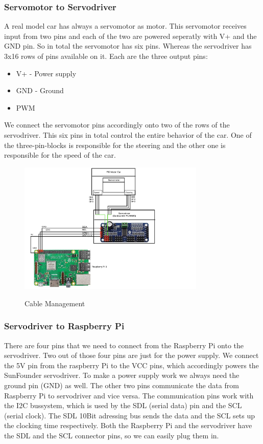 \documentclass[journal]{IEEEtran}
\begin{document}
\subsubsection{Servomotor to Servodriver}
A real model car has always a servomotor as motor. This servomotor receives input from two pins and each of the two are powered seperatly with V+ and the GND pin. 
So in total the servomotor has six pins. Whereas the servodriver has 3x16 rows of pins available on it. Each are the three output pins:

\begin{itemize}
\item V+ - Power supply
\item GND - Ground
\item PWM
\end{itemize}

We connect the servomotor pins accordingly onto two of the rows of the servodriver. This six pins in total control the entire behavior of the car. One of the three-pin-blocks is responsible for the steering and the other one is responsible for the speed of the car. \\

\begin{figure}
  \begin{center}
  \includegraphics[width=3.5in]{photo/ebene2.pdf}\\
  \caption{Cable Management}\label{ebene2}
  \end{center}
\end{figure}

\subsubsection{Servodriver to Raspberry Pi}
There are four pins that we need to connect from the Raspberry Pi onto the servodriver. Two out of those four pins are just for the power supply. We connect the 5V pin from the raspberry Pi to the VCC pins, which accordingly powers the SunFounder servodriver. To make a power supply work we always need the ground pin (GND) as well. The other two pins communicate the data from Raspberry Pi to servodriver and vice versa. The communication pins work with the I2C bussystem, which is used by the SDL (serial data) pin and the SCL (serial clock). The SDL 10Bit adressing bus sends the data and the SCL sets up the clocking time respectively. Both the Raspberry Pi and the servodriver have the SDL and the SCL connector pins, so we can easily plug them in. \\
\end{document}
